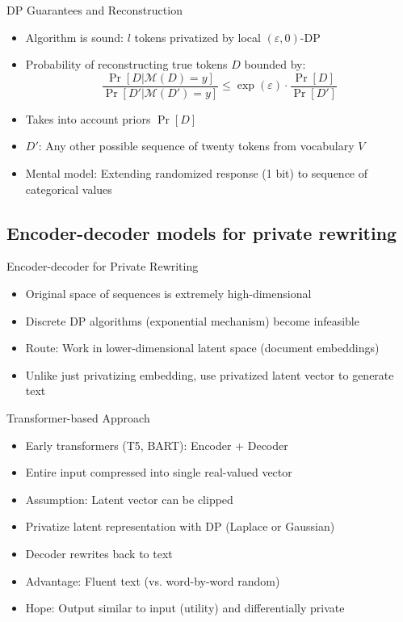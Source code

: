 \documentclass[12pt,aspectratio=169,handout]{beamer}
\begin{document}
\begin{frame}{DP Guarantees and Reconstruction}
\begin{itemize}
\item Algorithm is sound: $l$ tokens privatized by local $(\varepsilon, 0)$-DP
\item Probability of reconstructing true tokens $D$ bounded by:
$$
\frac{\Pr[D | \mathcal{M}(D) = y]}{\Pr[D' | \mathcal{M}(D') = y]} \leq \exp(\varepsilon) \cdot \frac{\Pr[D]}{\Pr[D']}
$$
\item Takes into account priors $\Pr[D]$
\item $D'$: Any other possible sequence of twenty tokens from vocabulary $V$
\item Mental model: Extending randomized response (1 bit) to sequence of categorical values
\end{itemize}
\end{frame}


\subsection{Encoder-decoder models for private rewriting}

\begin{frame}{Encoder-decoder for Private Rewriting}
\begin{itemize}
\item Original space of sequences is extremely high-dimensional
\item Discrete DP algorithms (exponential mechanism) become infeasible
\item Route: Work in lower-dimensional latent space (document embeddings)
\item Unlike just privatizing embedding, use privatized latent vector to generate text
\end{itemize}
\end{frame}

\begin{frame}{Transformer-based Approach}
\begin{itemize}
\item Early transformers (T5, BART): Encoder + Decoder
\item Entire input compressed into single real-valued vector
\item Assumption: Latent vector can be clipped
\item Privatize latent representation with DP (Laplace or Gaussian)
\item Decoder rewrites back to text
\item Advantage: Fluent text (vs. word-by-word random)
\item Hope: Output similar to input (utility) and differentially private
\end{itemize}
\end{frame}
\end{document}
